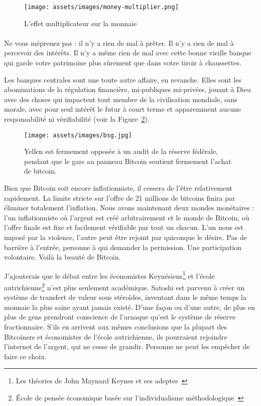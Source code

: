 \begin{figure}
  \centering
  \texttt{[image: assets/images/money-multiplier.png]}
  \caption{L'effet multiplicateur sur la monnaie}
  \label{fig:money-multiplier}
\end{figure}

\paragraph{}
Ne vous méprenez pas : il n'y a rien de mal à prêter. Il n'y a rien de mal à
percevoir des intérêts. Il n'y a même rien de mal avec cette bonne vieille
banque qui garde votre patrimoine plus sûrement que dans votre tiroir à
chaussettes.

Les banques centrales sont une toute autre affaire, en revanche. Elles sont les
abominations de la régulation financière, mi-publiques mi-privées, jouant à Dieu
avec des choses qui impactent tout membre de la civilisation mondiale, sans
morale, avec pour seul intérêt le futur à court terme et apparemment aucune
responsabilité ni vérifiabilité (voir la Figure~\ref{fig:bsg}).

\begin{figure}
  \centering
  \texttt{[image: assets/images/bsg.jpg]}
  \caption{Yellen est fermement opposée à un audit de la réserve fédérale,
  pendant que le gars au panneau Bitcoin soutient fermement l'achat de bitcoin.}
  \label{fig:bsg}
\end{figure}

Bien que Bitcoin soit encore inflationniste, il cessera de l'être relativement
rapidement. La limite stricte sur l'offre de 21 millions de bitcoins finira par
éliminer totalement l'inflation. Nous avons maintenant deux mondes monétaires :
l'un inflationniste où l'argent est créé arbitrairement et le monde de Bitcoin,
où l'offre finale est fixe et facilement vérifiable par tout un chacun. L'un
nous est imposé par la violence, l'autre peut être rejoint par quiconque le
désire. Pas de barrière à l'entrée, personne à qui demander la permission. Une
participation volontaire. Voilà la beauté de Bitcoin.

J'ajouterais que le débat entre les économistes Keynésiens\footnote{Les théories
de John Maynard Keynes et ses adeptes~\cite{wiki:keynesian}} et l'école
autrichienne\footnote{École de pensée économique basée sur l'individualisme
méthodologique~\cite{wiki:austrian}} n'est plus seulement académique. Satoshi
est parvenu à créer un système de transfert de valeur sous stéroïdes, inventant
dans le même temps la monnaie la plus saine ayant jamais existé. D'une façon ou
d'une autre, de plus en plus de gens prendront conscience de l'arnaque qu'est le
système de réserve fractionnaire. S'ils en arrivent aux mêmes conclusions que la
plupart des Bitcoiners et économistes de l'école autrichienne, ils pourraient
rejoindre l'internet de l'argent, qui ne cesse de grandir. Personne ne peut les
empêcher de faire ce choix.

